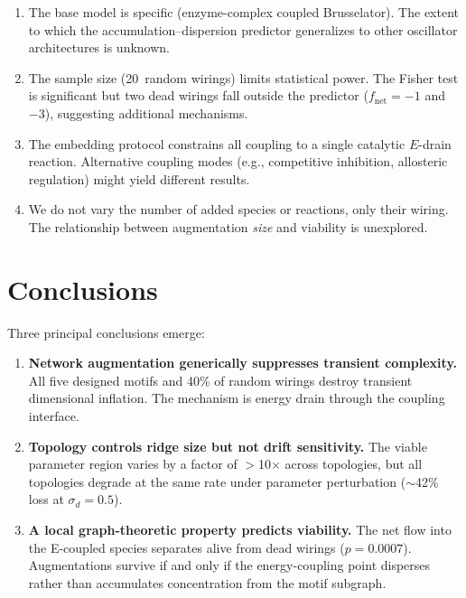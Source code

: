 \documentclass[twocolumn,showpacs,preprintnumbers,amsmath,amssymb,prd,floatfix]{revtex4-2}
\renewcommand{\sd}{\sigma_d}
\begin{document}
\begin{enumerate}
\item The base model is specific (enzyme-complex coupled Brusselator). The extent to which the accumulation--dispersion predictor generalizes to other oscillator architectures is unknown.

\item The sample size (20~random wirings) limits statistical power. The Fisher test is significant but two dead wirings fall outside the predictor ($f_\text{net} = -1$ and $-3$), suggesting additional mechanisms.

\item The embedding protocol constrains all coupling to a single catalytic $E$-drain reaction. Alternative coupling modes (e.g., competitive inhibition, allosteric regulation) might yield different results.

\item We do not vary the number of added species or reactions, only their wiring. The relationship between augmentation \textit{size} and viability is unexplored.
\end{enumerate}

\section{Conclusions}
\label{sec:conclusions}

Three principal conclusions emerge:

\begin{enumerate}
\item \textbf{Network augmentation generically suppresses transient complexity.} All five designed motifs and 40\% of random wirings destroy transient dimensional inflation. The mechanism is energy drain through the coupling interface.

\item \textbf{Topology controls ridge size but not drift sensitivity.} The viable parameter region varies by a factor of $>$10$\times$ across topologies, but all topologies degrade at the same rate under parameter perturbation ($\sim$42\% loss at $\sd = 0.5$).

\item \textbf{A local graph-theoretic property predicts viability.} The net flow into the E-coupled species separates alive from dead wirings ($p = 0.0007$). Augmentations survive if and only if the energy-coupling point disperses rather than accumulates concentration from the motif subgraph.
\end{enumerate}
\end{document}
